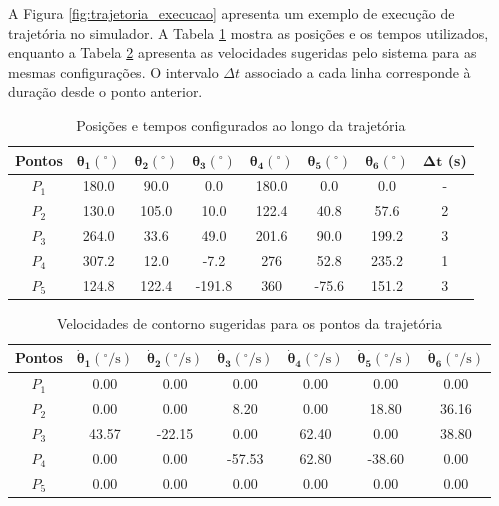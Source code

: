 A Figura \ref{fig:trajetoria_execucao} apresenta um exemplo de execução de trajetória no simulador. A Tabela \ref{tab:trajetoria} mostra as posições e os tempos utilizados, enquanto a Tabela \ref{tab:velocidades_trajetoria} apresenta as velocidades sugeridas pelo sistema para as mesmas configurações. O intervalo $\Delta t$ associado a cada linha corresponde à duração desde o ponto anterior.

\begin{table}[H]
\centering
\caption{Posições e tempos configurados ao longo da trajetória}
\label{tab:trajetoria}
\begin{tabular}{c c c c c c c c}
\hline
\textbf{Pontos} & $\boldsymbol{\theta_1}(^\circ)$ & $\boldsymbol{\theta_2}(^\circ)$ & $\boldsymbol{\theta_3}(^\circ)$ & $\boldsymbol{\theta_4}(^\circ)$ & $\boldsymbol{\theta_5}(^\circ)$ & $\boldsymbol{\theta_6}(^\circ)$ & $\boldsymbol{\Delta t}$ (s) \\ 
\hline
$P_{1}$ & 180.0 & 90.0 & 0.0 & 180.0 & 0.0 & 0.0 & - \\
$P_{2}$ & 130.0 & 105.0 & 10.0 & 122.4 & 40.8 & 57.6 & 2 \\
$P_{3}$ & 264.0 & 33.6 & 49.0 & 201.6 & 90.0 & 199.2 & 3 \\
$P_{4}$ & 307.2 & 12.0 & -7.2 & 276 & 52.8 & 235.2 & 1 \\
$P_{5}$ & 124.8 & 122.4 & -191.8 & 360 & -75.6 & 151.2 & 3 \\


\hline
\end{tabular}
\end{table}

\begin{table}[H]
\centering
\caption{Velocidades de contorno sugeridas para os pontos da trajetória}
\label{tab:velocidades_trajetoria}
\begin{tabular}{c c c c c c c}
\hline
\textbf{Pontos} & $\boldsymbol{\dot{\theta}_1}(^\circ/\mathrm{s})$ & $\boldsymbol{\dot{\theta}_2}(^\circ/\mathrm{s})$ & $\boldsymbol{\dot{\theta}_3}(^\circ/\mathrm{s})$ & $\boldsymbol{\dot{\theta}_4}(^\circ/\mathrm{s})$ & $\boldsymbol{\dot{\theta}_5}(^\circ/\mathrm{s})$ & $\boldsymbol{\dot{\theta}_6}(^\circ/\mathrm{s})$ \\
\hline
$P_{1}$ & 0.00 & 0.00 & 0.00 & 0.00 & 0.00 & 0.00 \\
$P_{2}$ & 0.00 & 0.00 & 8.20 & 0.00 & 18.80 & 36.16 \\
$P_{3}$ & 43.57 & -22.15 & 0.00 & 62.40 & 0.00 & 38.80 \\
$P_{4}$ & 0.00 & 0.00 & -57.53 & 62.80 & -38.60 & 0.00 \\
$P_{5}$ & 0.00 & 0.00 & 0.00 & 0.00 & 0.00 & 0.00 \\
\hline
\end{tabular}%
\end{table}

